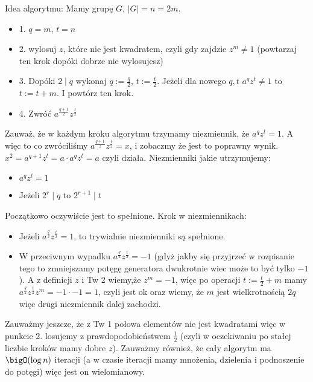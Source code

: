 Idea algorytmu:
Mamy grupę $G$, $|G| = n = 2m$.
\begin{itemize}
    \item 1. $q = m$, $t = n$
    \item 2. wylosuj $z$, które nie jest kwadratem, czyli gdy zajdzie $z^m \neq 1$ (powtarzaj ten krok dopóki dobrze nie wylosujesz)
    \item 3. Dopóki $2 \mid q$ wykonaj $q := \frac{q}{2}$, $t := \frac{t}{2}$. Jeżeli dla nowego $q,t$ $a^qz^t \neq 1$ to $t := t + m$. I powtórz ten krok.
    \item 4. Zwróć $a^{\frac{q+1}{2}}z^{\frac{t}{2}}$
\end{itemize}
Zauważ, że w każdym kroku algorytmu trzymamy niezmiennik, że $a^qz^t = 1$. A więc to co zwróciliśmy $a^{\frac{q+1}{2}}z^{\frac{t}{2}} = x$, i zobaczmy że jest to poprawny wynik. $x^2 = a^{q+1}z^{t} = a\cdot a^qz^t = a$ czyli działa. \newline
Niezmienniki jakie utrzymujemy:
\begin{itemize}
    \item $a^qz^t = 1$
    \item Jeżeli $2^r \mid q$ to $2^{r+1} \mid t$
\end{itemize}
Początkowo oczywiście jest to spełnione.
Krok w niezmiennikach:
\begin{itemize}
    \item Jeżeli $a^{\frac{q}{2}}z^{\frac{t}{2}} = 1$, to trywialnie niezmienniki są spełnione.
    \item W przeciwnym wypadku $a^{\frac{q}{2}}z^{\frac{t}{2}} = -1$ (gdyż jakby się przyjrzeć w rozpisanie tego to zmniejszamy potęgę generatora dwukrotnie wiec może to być tylko $-1$). A z definicji $z$ i Tw 2 wiemy,że $z^m = -1$, więc po operacji $t := \frac{t}{2} + m$ mamy $a^{\frac{q}{2}}z^{\frac{t}{2}}z^m = -1\cdot -1 = 1$, czyli jest ok oraz wiemy, że $m$ jest wielkrotnością $2q$ więc drugi niezmiennik dalej zachodzi.
\end{itemize}
Zauważmy jeszcze, że z Tw 1 połowa elementów nie jest kwadratami więc w punkcie 2. losujemy z prawdopodobieństwem $\frac{1}{2}$ (czyli w oczekiwaniu po stałej liczbie kroków mamy dobre $z$).
\newline \newline
Zauważmy również, że cały algorytm ma $\bigO(\log n)$ iteracji (a w czasie iteracji mamy mnożenia, dzielenia i podnoszenie do potęgi) więc jest on wielomianowy.